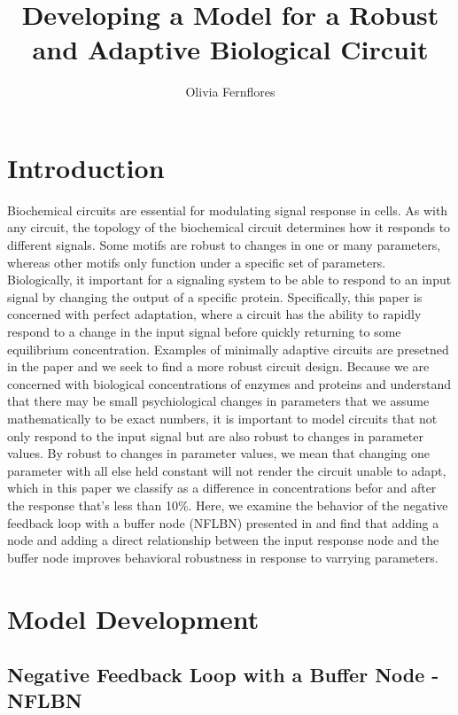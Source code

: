 \documentclass{article}
\title{Developing a Model for a Robust and Adaptive Biological Circuit}
\author{Olivia Fernflores}
\begin{document}
\maketitle

\section{Introduction}
Biochemical circuits are essential for modulating signal response in cells. As with any circuit, the topology of the biochemical circuit determines how it responds to different signals. Some motifs are robust to changes in one or many parameters, whereas other motifs only function under a specific set of parameters. Biologically, it important for a signaling system to be able to respond to an input signal by changing the output of a specific protein. Specifically, this paper is concerned with perfect adaptation, where a circuit has the ability to rapidly respond to a change in the input signal before quickly returning to some equilibrium concentration. Examples of minimally adaptive circuits are presetned in the paper \cite{challenge2paperD2L} and we seek to find a more robust circuit design. Because we are concerned with biological concentrations of enzymes and proteins and understand that there may be small psychiological changes in parameters that we assume mathematically to be exact numbers, it is important to model circuits that not only respond to the input signal but are also robust to changes in parameter values. By robust to changes in parameter values, we mean that changing one parameter with all else held constant will not render the circuit unable to adapt, which in this paper we classify as a difference in concentrations befor and after the response that's less than 10\%. Here, we examine the behavior of the negative feedback loop with a buffer node (NFLBN) presented in \cite{challenge2paperD2L} and find that adding a node and adding a direct relationship between the input response node and the buffer node improves behavioral robustness in response to varrying parameters. 

\section{Model Development}

\subsection{Negative Feedback Loop with a Buffer Node - NFLBN}
\end{document}
